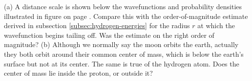 (a) A distance scale is shown below the wavefunctions and
probability densities illustrated in 
figure  on page \pageref{fig:hydrogen-three-states}.
Compare this with the order-of-magnitude estimate derived in subsection
\ref{subsec:hydrogen-energies} for the radius $r$ at which the wavefunction begins
tailing off. Was the estimate on the right
order of magnitude?\hwendpart
(b) Although we normally say the moon
orbits the earth, actually they both orbit around their
common center of mass, which is below the earth's surface
but not at its center. The same is true of the hydrogen
atom. Does the center of mass lie inside the proton, or outside it?\hwendpart
